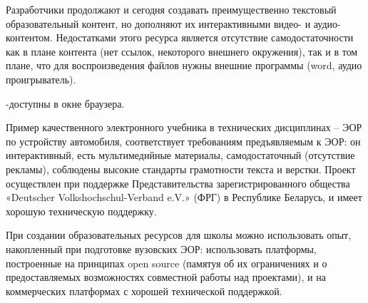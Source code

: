 Разработчики продолжают и сегодня создавать преимущественно текстовый образовательный контент, но дополняют их интерактивными видео- и аудио- контентом\cite{opk}. Недостатками этого ресурса является отсутствие самодостаточности как в плане контента (нет ссылок, некоторого внешнего окружения), так и в том плане, что для воспроизведения файлов нужны внешние программы (word, аудио проигрыватель). 

-доступны в окне браузера.

Пример качественного электронного учебника в технических дисциплинах – ЭОР по устройству автомобиля\cite{automobile}, соответствует требованиям предъявляемым к ЭОР: он интерактивный, есть мультимедийные материалы, самодостаточный (отсутствие рекламы), соблюдены высокие стандарты грамотности текста и верстки. Проект осуществлен при поддержке Представительства зарегистрированного общества «Deutscher Volkshochschul-Verband e.V.» (ФРГ) в Республике Беларусь, и имеет хорошую техническую поддержку.

При создании образовательных ресурсов для школы можно использовать опыт, накопленный при подготовке вузовских ЭОР: использовать платформы, построенные на принципах open source (памятуя об их ограничениях и о предоставляемых возможностях совместной работы над проектами), и  на коммерческих платформах с хорошей технической поддержкой.

